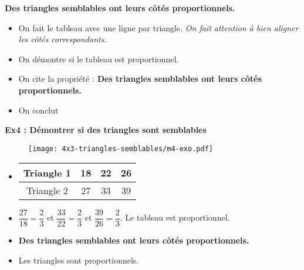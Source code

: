 \textbf{Des triangles semblables ont leurs côtés proportionnels.} 

\begin{itemize}
  \item On fait le tableau avec une ligne par triangle. \textit{On fait attention à bien aligner les côtés correspondants.}
  \item On démontre si le tableau est proportionnel.
  \item On cite la propriété : \textbf{Des triangles semblables ont leurs côtés proportionnels.} 
  \item On conclut
\end{itemize}

\horrule{1px}
\textbf{Ex4 : Démontrer si des triangles sont semblables}

\begin{multicols}{2}
  \begin{figure}[H]
    \centering
    \texttt{[image: 4x3-triangles-semblables/m4-exo.pdf]}
  \end{figure}
  \columnbreak

  \begin{itemize}
    \item     
    \begin{tabular}{|c|c|c|c|}
      \hline
      Triangle 1 & 18 & 22 & 26 \\  \hline
      Triangle 2 & 27 & 33 & 39\\  \hline
    \end{tabular}
    \item $\dfrac{27}{18} = \dfrac{2}{3}$ et $\dfrac{33}{22} = \dfrac{2}{3}$ et $\dfrac{39}{26} = \dfrac{2}{3}$. \newline
    Le tableau est proportionnel.
    \item \textbf{Des triangles semblables ont leurs côtés proportionnels.} 
    \item Les triangles sont proportionnels.
  \end{itemize}
\end{multicols}

